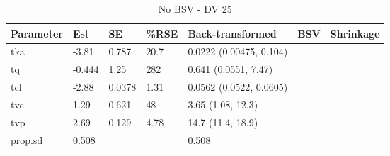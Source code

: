 \begin{table}
\centering\centering
\caption{No BSV - DV 25}
\centering
\fontsize{8}{10}\selectfont
\begin{tabular}[t]{lllllll}
\toprule
\textbf{Parameter} & \textbf{Est} & \textbf{SE} & \textbf{\%RSE} & \textbf{Back-transformed} & \textbf{BSV} & \textbf{Shrinkage}\\
\midrule
tka & -3.81 & 0.787 & 20.7 & 0.0222 (0.00475, 0.104) &  & \\
\midrule
tq & -0.444 & 1.25 & 282 & 0.641 (0.0551, 7.47) &  & \\
\midrule
tcl & -2.88 & 0.0378 & 1.31 & 0.0562 (0.0522, 0.0605) &  & \\
\midrule
tvc & 1.29 & 0.621 & 48 & 3.65 (1.08, 12.3) &  & \\
\midrule
tvp & 2.69 & 0.129 & 4.78 & 14.7 (11.4, 18.9) &  & \\
\midrule
prop.sd & 0.508 &  &  & 0.508 &  & \\
\bottomrule
\end{tabular}
\end{table}